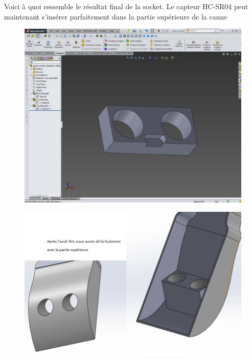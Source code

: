 \FloatBarrier

Voici à quoi ressemble le résultat final de la socket. 
Le capteur HC-SR04 peut maintenant s’insérer parfaitement dans la partie supérieure de la canne

\begin{figure}[!htbp]
    \centering
    \includegraphics[width=.8\linewidth]{assets/conception1/img311.jpg}
\end{figure}

\FloatBarrier

\begin{figure}[!htbp]
    \centering
    \includegraphics[width=\linewidth]{assets/conception1/22.png}
\end{figure}

\FloatBarrier

